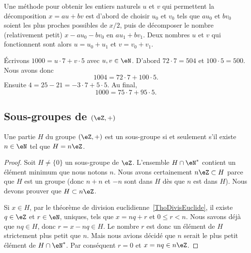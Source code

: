 \begin{normaltext}
    Une méthode pour obtenir les entiers naturels $u$ et $v$ qui permettent la décomposition \(x = au + bv \) est d'abord de choisir $u_0$ et $v_0$ tels que \( au_0 \) et \( bv_0 \) soient les plus proches possibles de $x/2$, puis de décomposer le nombre (relativement petit) \( x - au_0 - bv_0 \) en \( au_1 + bv_1 \). Deux nombres $u$ et $v$ qui fonctionnent sont alors $u = u_0 + u_1$ et $v = v_0 + v_1$.
\end{normaltext}

\begin{example}
    Écrivons \( 1000=u\cdot 7+v\cdot 5\) avec \( u,v\in \eN\). D'abord \( 72\cdot 7=504\) et \( 100\cdot 5=500\). Nous avons donc
    \begin{equation}
        1004=72\cdot 7+100\cdot 5.
    \end{equation}
    Ensuite \( 4=25-21=-3\cdot 7+5\cdot 5\). Au final,
    \begin{equation}
        1000=75\cdot 7+95\cdot 5.
    \end{equation}
\end{example}

\subsection{Sous-groupes de \texorpdfstring{$(\eZ,+)$}{(Z,+)}}

\begin{proposition} \label{PropSsgpZestnZ}
    Une partie \( H\) du groupe \( (\eZ,+)\) est un sous-groupe si et seulement s'il existe \( n\in\eN\) tel que \( H=n\eZ\).
\end{proposition}

\begin{proof}
    Soit \( H\neq\{ 0 \}\) un sous-groupe de \( \eZ\). L'ensemble \( H\cap\eN^*\) contient un élément minimum que nous notons \( n\). Nous avons certainement \( n\eZ\subset H\) parce que \( H\) est un groupe (donc \( n+n\) et \( -n\) sont dans \( H\) dès que \( n\) est dans \( H\)). Nous devons prouver que \( H\subset n\eZ\).

    Si \( x\in H\), par le théorème de division euclidienne~\ref{ThoDivisEuclide}, il existe \( q\in\eZ\) et \( r\in\eN \), uniques, tels que \( x=nq+r\) et \(0 \leq r < n \). Nous savons déjà que \( nq\in H\), donc \( r = x - nq \in H \). Le nombre \( r\) est donc un élément de \( H\) strictement plus petit que \( n\). Mais nous avions décidé que \( n\) serait le plus petit élément de \( H\cap\eN^*\). Par conséquent \( r=0\) et \( x=nq\in n\eZ\).
\end{proof}



